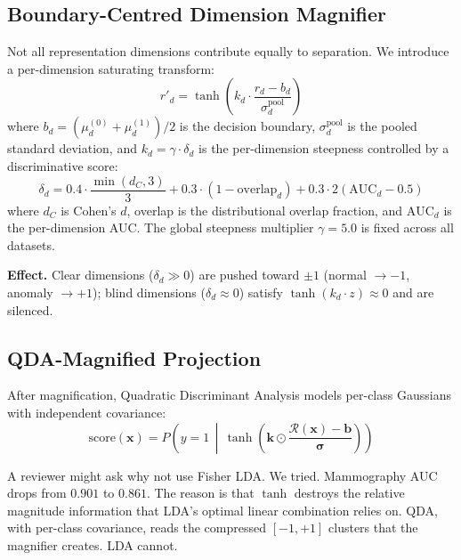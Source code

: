 \documentclass{article}
\newcommand{\calR}{\mathcal{R}}
\begin{document}
\subsection{Boundary-Centred Dimension Magnifier}

Not all representation dimensions contribute equally to separation. We introduce a per-dimension saturating transform:
\begin{equation}
r'_d = \tanh\!\left(k_d \cdot \frac{r_d - b_d}{\sigma_d^{\text{pool}}}\right)
\label{eq:magnifier}
\end{equation}
where $b_d = (\mu_d^{(0)} + \mu_d^{(1)})/2$ is the decision boundary, $\sigma_d^{\text{pool}}$ is the pooled standard deviation, and $k_d = \gamma \cdot \delta_d$ is the per-dimension steepness controlled by a discriminative score:
\begin{equation}
\delta_d = 0.4 \cdot \frac{\min(d_C, 3)}{3} + 0.3 \cdot (1 - \text{overlap}_d) + 0.3 \cdot 2(\text{AUC}_d - 0.5)
\end{equation}
where $d_C$ is Cohen's $d$, overlap is the distributional overlap fraction, and $\text{AUC}_d$ is the per-dimension AUC. The global steepness multiplier $\gamma = 5.0$ is fixed across all datasets.

\textbf{Effect.} Clear dimensions ($\delta_d \gg 0$) are pushed toward $\pm 1$ (normal $\to -1$, anomaly $\to +1$); blind dimensions ($\delta_d \approx 0$) satisfy $\tanh(k_d \cdot z) \approx 0$ and are silenced.

\subsection{QDA-Magnified Projection}

After magnification, Quadratic Discriminant Analysis models per-class Gaussians with independent covariance:
\begin{equation}
\text{score}(\mathbf{x}) = P\!\left(y{=}1 \,\middle|\, \tanh\!\left(\mathbf{k} \odot \frac{\calR(\mathbf{x}) - \mathbf{b}}{\bm{\sigma}}\right)\right)
\label{eq:qda_magnified}
\end{equation}

A reviewer might ask why not use Fisher LDA. We tried. Mammography AUC drops from $0.901$ to $0.861$. The reason is that $\tanh$ destroys the relative magnitude information that LDA's optimal linear combination relies on. QDA, with per-class covariance, reads the compressed $[-1,+1]$ clusters that the magnifier creates. LDA cannot.

\end{document}
